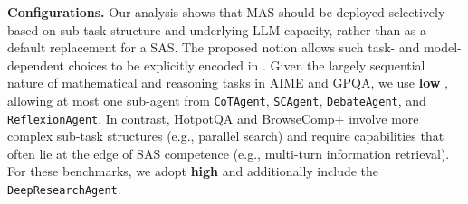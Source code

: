 \textbf{Configurations.} Our analysis shows that MAS should be deployed selectively based on sub-task
structure and underlying LLM capacity, rather than as a default
replacement for a SAS. The proposed \textbf{\masness} notion
allows such task- and model-dependent choices to be explicitly encoded in
\ourframework. Given the largely sequential nature of mathematical and reasoning tasks in
AIME and GPQA, we use \textbf{low \masness}, allowing at most one
sub-agent from \texttt{CoTAgent}, \texttt{SCAgent}, \texttt{DebateAgent}, and \texttt{ReflexionAgent}. In contrast, HotpotQA and BrowseComp+ involve more complex sub-task
structures (e.g., parallel search) and require capabilities that often lie at
the edge of SAS competence (e.g., multi-turn information retrieval). For these
benchmarks, we adopt \textbf{high \masness} and additionally include the \texttt{DeepResearchAgent}.

